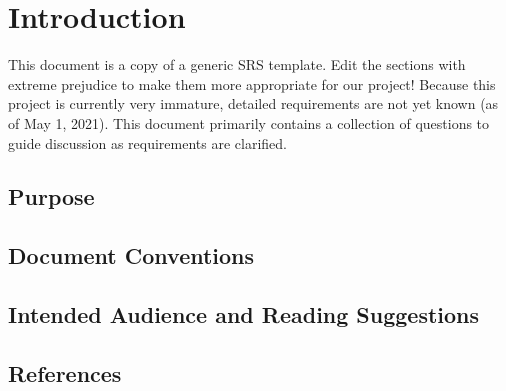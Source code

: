 \chapter{Introduction}

This document is a copy of a generic SRS template. Edit the sections
with extreme prejudice to make them more appropriate for our project!
Because this project is currently very immature, detailed requirements
are not yet known (as of May 1, 2021). This document primarily
contains a collection of questions to guide discussion as requirements
are clarified.

\section{Purpose}

\section{Document Conventions}
\section{Intended Audience and Reading Suggestions}

\section{References}
